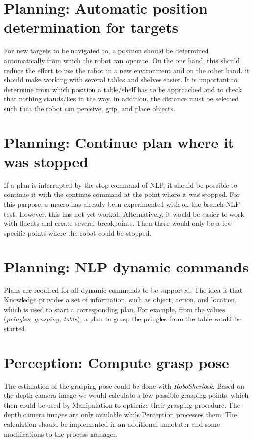 \documentclass[main.tex]{subfiles}
\begin{document}
		\section{Planning: Automatic position determination for targets}
		For new targets to be navigated to, a position should be determined automatically from which the robot can operate. On the one hand, this should reduce the effort to use the robot in a new environment and on the other hand, it should make working with several tables and shelves easier. It is important to determine from which position a table/shelf has to be approached and to check that nothing stands/lies in the way. In addition, the distance must be selected such that the robot can perceive, grip, and place objects.	
		
		\section{Planning: Continue plan where it was stopped}
		If a plan is interrupted by the stop command of NLP, it should be possible to continue it with the continue command at the point where it was stopped. For this purpose, a macro has already been experimented with on the branch NLP-test. However, this has not yet worked. Alternatively, it would be easier to work with fluents and create several breakpoints. Then there would only be a few specific points where the robot could be stopped.
		
		\section{Planning: NLP dynamic commands}
		Plans are required for all dynamic commands to be supported. The idea is that Knowledge provides a set of information, such as object, action, and location, which is used to start a corresponding plan. For example, from the values (\textit{pringles, grasping, table}), a plan to grasp the pringles from the table would be started.
		
		\section{Perception: Compute grasp pose}
		The estimation of the grasping pose could be done with \textit{RoboSherlock}. Based on the depth camera image we would calculate a few possible grasping points, which then could be used by Manipulation to optimize their grasping procedure. The depth camera images are only available while Perception processes them. The calculation should be implemented in an additional annotator and some modifications to the process manager.
		
\end{document}
